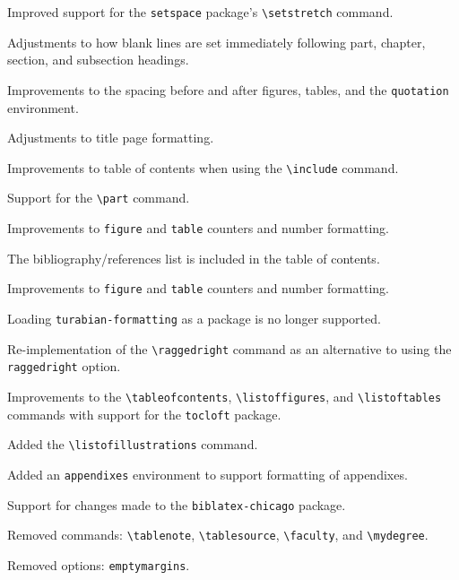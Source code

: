 \documentclass{article}
\newcommand{\textcmd}[1]{\texttt{\textbackslash #1}}
\begin{document}
%

Improved support for the \texttt{setspace} package's \textcmd{setstretch} command.

Adjustments to how blank lines are set immediately following part, chapter, section, and subsection headings.

Improvements to the spacing before and after figures, tables, and the \texttt{quotation} environment.

%

Adjustments to title page formatting.

%

Improvements to table of contents when using the \textcmd{include} command.

%

Support for the \textcmd{part} command.

Improvements to \texttt{figure} and \texttt{table} counters and number formatting.

The bibliography/references list is included in the table of contents.

%

Improvements to \texttt{figure} and \texttt{table} counters and number formatting.

Loading \texttt{turabian-formatting} as a package is no longer supported.

%

Re-implementation of the \textcmd{raggedright} command as an alternative to using the \texttt{raggedright} option.

Improvements to the \textcmd{tableofcontents}, \textcmd{listoffigures}, and \textcmd{listoftables} commands with support for the \texttt{tocloft} package.

Added the \textcmd{listofillustrations} command.

Added an \texttt{appendixes} environment to support formatting of appendixes.

Support for changes made to the \texttt{biblatex-chicago} package.

Removed commands: \textcmd{tablenote}, \textcmd{tablesource}, \textcmd{faculty}, and \textcmd{mydegree}.

Removed options: \texttt{emptymargins}.

%
\end{document}

